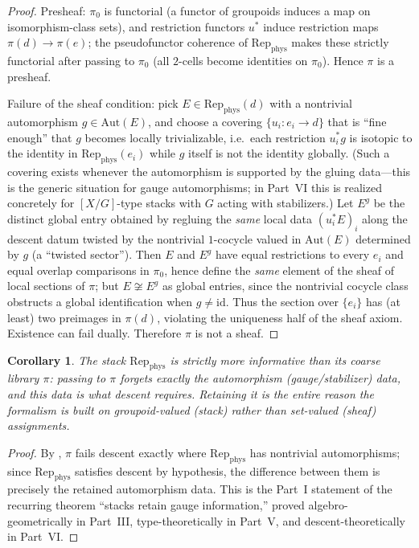 \documentclass[12pt]{article}
\newtheorem{corollary}[theorem]{Corollary}
\theoremstyle{definition}
\theoremstyle{remark}
\newcommand{\Repphys}{\mathrm{Rep}_{\mathrm{phys}}}
\newcommand{\Aut}{\mathrm{Aut}}
\newcommand{\id}{\mathrm{id}}
\begin{document}
\begin{proof}
Presheaf: $\pi_0$ is functorial (a functor of groupoids induces a map on
isomorphism-class sets), and restriction functors $u^\ast$ induce restriction
maps $\pi(d) \to \pi(e)$; the pseudofunctor coherence of $\Repphys$ makes these
strictly functorial after passing to $\pi_0$ (all $2$-cells become identities on
$\pi_0$). Hence $\pi$ is a presheaf.

Failure of the sheaf condition: pick $E \in \Repphys(d)$ with a nontrivial
automorphism $g \in \Aut(E)$, and choose a covering $\{u_i : e_i \to d\}$ that is
``fine enough'' that $g$ becomes locally trivializable, i.e.\ each restriction
$u_i^\ast g$ is isotopic to the identity in $\Repphys(e_i)$ while $g$ itself is
not the identity globally. (Such a covering exists whenever the automorphism is
supported by the gluing data---this is the generic situation for gauge
automorphisms; in Part~VI this is realized concretely for $[X/G]$-type stacks
with $G$ acting with stabilizers.) Let $E^{g}$ be the distinct global entry
obtained by regluing the \emph{same} local data $(u_i^\ast E)_i$ along the
descent datum twisted by the nontrivial $1$-cocycle valued in $\Aut(E)$
determined by $g$ (a ``twisted sector''). Then $E$ and $E^{g}$ have equal
restrictions to every $e_i$ and equal overlap comparisons in $\pi_0$, hence
define the \emph{same} element of the sheaf of local sections of $\pi$; but
$E \not\cong E^{g}$ as global entries, since the nontrivial cocycle
class obstructs a global identification when $g \neq \id$. Thus the section over
$\{e_i\}$ has (at least) two preimages in $\pi(d)$, violating the uniqueness
half of the sheaf axiom. Existence can fail dually. Therefore $\pi$ is not a
sheaf.
\end{proof}

\begin{corollary}
\label{cor:stack-informative}
The stack $\Repphys$ is strictly more informative than its coarse library
$\pi$: passing to $\pi$ forgets exactly the automorphism (gauge/stabilizer) data,
and this data is what descent requires. Retaining it is the entire reason the
formalism is built on groupoid-valued (stack) rather than set-valued (sheaf)
assignments.
\end{corollary}

\begin{proof}
By , $\pi$ fails descent exactly where $\Repphys$ has nontrivial
automorphisms; since $\Repphys$ satisfies descent by hypothesis, the difference
between them is precisely the retained automorphism data. This is the Part~I
statement of the recurring theorem ``stacks retain gauge information,'' proved
algebro-geometrically in Part~III, type-theoretically in Part~V, and
descent-theoretically in Part~VI.
\end{proof}
\end{document}
